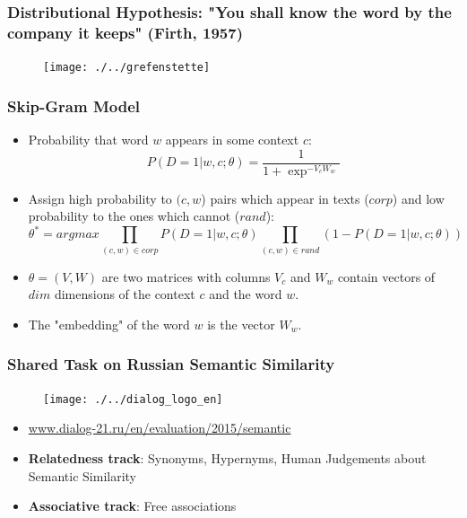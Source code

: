 \begin{frame}
\frametitle{Distributional Hypothesis: "You shall know the word by the company it keeps" (Firth, 1957)}

\begin{figure}
\centering
\texttt{[image: ./../grefenstette]}
\end{figure}
	
\end{frame}




\begin{frame}

\frametitle{Skip-Gram Model}

\begin{itemize}

\item Probability that word $w$ appears in some context $c$:
{\small
$$ P(D=1| w,c;\theta) = \frac{1}{1+ \exp^{-V_c W_w}}$$  
}

\item Assign high probability to $(c,w$) pairs which appear in texts ($corp$) and low probability to the ones which cannot ($rand$): 
{\small 
$$\theta^* = arg max \prod_{(c,w) \in corp} P(D=1|w,c;\theta) \prod_{(c,w) \in rand} (1 - P(D=1|w,c;\theta))$$ 
}
\item $\theta = (V,W)$ are two matrices with columns $V_c$ and $W_w$ contain vectors of $dim$ dimensions of the context $c$ and the word $w$. 

\item The "embedding" of the word $w$ is the vector $W_w$. 


	
\end{itemize}

	
\end{frame}



\begin{frame}
\frametitle{Shared Task on Russian Semantic Similarity}

\begin{figure}  
    \texttt{[image: ./../dialog\_logo\_en]}
\end{figure}

\begin{itemize}
\item \url{www.dialog-21.ru/en/evaluation/2015/semantic}

\item  \textbf{Relatedness track}: Synonyms, Hypernyms, Human Judgements about Semantic Similarity
\item  \textbf{Associative track}: Free associations 
\end{itemize}

\end{frame}




